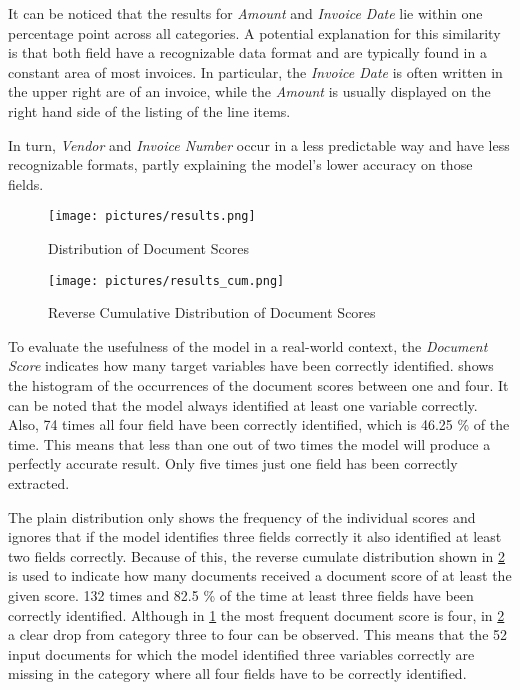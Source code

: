 It can be noticed that the results for \textit{Amount} and \textit{Invoice Date} lie within one percentage point across all categories. A potential explanation for this similarity is that both field have a recognizable data format and are typically found in a constant area of most invoices. In particular, the \textit{Invoice Date} is often written in the upper right are of an invoice, while the \textit{Amount} is usually displayed on the right hand side of the listing of the line items.

In turn, \textit{Vendor} and \textit{Invoice Number} occur in a less predictable way and have less recognizable formats, partly explaining the model's lower accuracy on those fields. 

\begin{figure}[!ht]
    \centering 
    \texttt{[image: pictures/results.png]}
    \caption{Distribution of Document Scores}
    \label{pic:results_1}    %
\end{figure}
\begin{figure}[!ht]
    \centering 
    \texttt{[image: pictures/results\_cum.png]}
    \caption{Reverse Cumulative Distribution of Document Scores}
    \label{pic:results_1_cum}    %
\end{figure}

To evaluate the usefulness of the model in a real-world context, the \textit{Document Score} indicates how many target variables have been correctly identified.  shows the histogram of the occurrences of the document scores between one and four. It can be noted that the model always identified at least one variable correctly. Also, 74 times all four field have been correctly identified, which is 46.25 \% of the time. This means that less than one out of two times the model will produce a perfectly accurate result. Only five times just one field has been correctly extracted.

The plain distribution only shows the frequency of the individual scores and ignores that if the model identifies three fields correctly it also identified at least two fields correctly. Because of this, the reverse cumulate distribution shown in \cref{pic:results_1_cum} is used to indicate how many documents received a document score of at least the given score. 132 times and 82.5 \% of the time at least three fields have been correctly identified. Although in \cref{pic:results_1} the most frequent document score is four, in \cref{pic:results_1_cum} a clear drop from category three to four can be observed. This means that the 52 input documents for which the model identified three variables correctly are missing in the category where all four fields have to be correctly identified.

